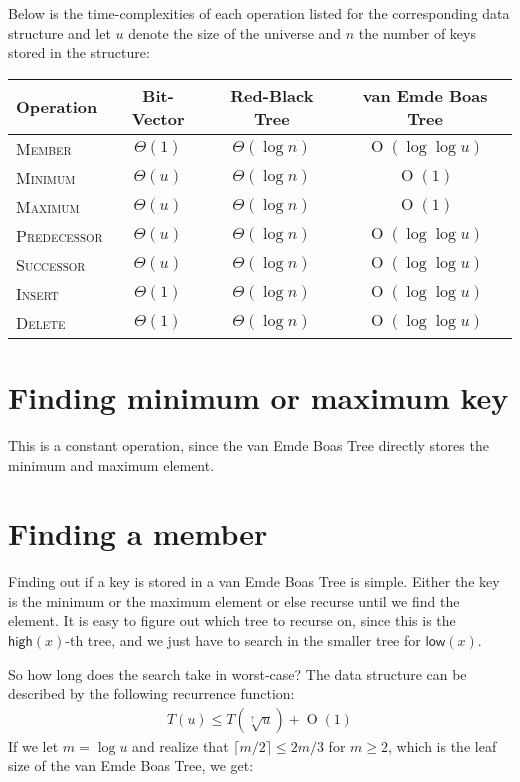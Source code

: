 \documentclass[oneside,11pt,openright]{report}
\newcommand{\BigO}[1]{\ensuremath{\operatorname{O}\left(#1\right)}}
\newcommand{\BigT}[1]{\ensuremath{\Theta\left(#1\right)}}
\newcommand{\Insert}{\textsc{Insert}}
\newcommand{\Delete}{\textsc{Delete}}
\newcommand{\Member}{\textsc{Member}}
\newcommand{\Minimum}{\textsc{Minimum}}
\newcommand{\Maximum}{\textsc{Maximum}}
\newcommand{\Predecessor}{\textsc{Predecessor}}
\newcommand{\Successor}{\textsc{Successor}}
\newcommand{\HIGH}{\textsf{high}}
\newcommand{\LOW}{\textsf{low}}
\newcommand{\HIGHER}{\sqrt[\uparrow]{u}}
\begin{document}
Below is the time-complexities of each operation listed for the corresponding data structure and let $u$ denote the size of the universe and $n$ the number of keys stored in the structure:

\begin{center}
  \begin{tabular}{ l | c | c | c }
    Operation & Bit-Vector & Red-Black Tree & van Emde Boas Tree \\ \hline
    \Member & $\BigT{1}$ & $\BigT{\log n}$ & $\BigO{\log \log u}$ \\ 
    \Minimum & $\BigT{u}$ & $\BigT{\log n}$ & $\BigO{1}$\\ 
    \Maximum & $\BigT{u}$ & $\BigT{\log n}$ & $\BigO{1}$ \\ 
    \Predecessor & $\BigT{u}$ & $\BigT{\log n}$ & $\BigO{\log \log u}$  \\ 
    \Successor & $\BigT{u}$ & $\BigT{\log n}$ & $\BigO{\log \log u}$ \\ 
    \Insert & $\BigT{1}$ & $\BigT{\log n}$ & $\BigO{\log \log u}$ \\ 
    \Delete & $\BigT{1}$ & $\BigT{\log n}$ & $\BigO{\log \log u}$ \\
  \end{tabular}
\end{center}

\section{Finding minimum or maximum key}

This is a constant operation, since the van Emde Boas Tree directly stores the minimum and maximum element.

\section{Finding a member}

Finding out if a key is stored in a van Emde Boas Tree is simple. Either the key is the minimum or the maximum element or else recurse until we find the element. It is easy to figure out which tree to recurse on, since this is the $\HIGH(x)$-th tree, and we just have to search in the smaller tree for $\LOW(x)$.

So how long does the search take in worst-case? The data structure can be described by the following recurrence function: 
\begin{align*}
    T(u) \leq T(\HIGHER) + \BigO{1}
\end{align*}
If we let $m = \log u$ and realize that $\lceil{m/2}\rceil \leq 2m/3$ for $m \geq 2$, which is the leaf size of the van Emde Boas Tree, we get:
\end{document}
